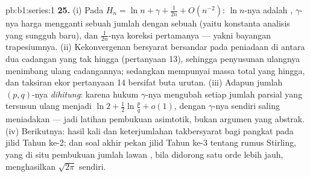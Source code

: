 \begin{solution}{pb:b1:series:1}
\textbf{25.} (i) Pada $H_n = \ln n + \gamma + \frac{1}{2n} +
O(n^{-2})$: $\ln n$-nya adalah , $\gamma$-nya harga
mengganti sebuah jumlah dengan sebuah  (yaitu konstanta analisis yang
sungguh baru), dan $\frac{1}{2n}$-nya koreksi pertamanya --- yakni
bayangan trapesiumnya. (ii) Kekonvergenan bersyarat bersandar pada
peniadaan di antara dua cadangan yang tak hingga (pertanyaan 13), sehingga
penyusunan ulangnya menimbang ulang cadangannya; sedangkan  mempunyai
massa total yang hingga, dan taksiran ekor pertanyaan 14 bersifat
buta urutan. (iii) Adapun jumlah $(p,q)$-nya \emph{dihitung}: karena
hukum $\gamma$-nya mengubah setiap jumlah parsial yang tersusun ulang menjadi $\ln 2 +
\frac12\ln\frac pq + o(1)$, dengan $\gamma$-nya sendiri saling meniadakan ---
jadi latihan pembukuan asimtotik, bukan argumen yang abstrak.
(iv) Berikutnya: hasil kali dan keterjumlahan takbersyarat bagi 
pangkat pada jilid Tahun ke-2; dan soal akhir pekan jilid Tahun ke-3
tentang rumus Stirling, yang di situ pembukuan jumlah lawan ,
bila didorong satu orde lebih jauh, menghasilkan $\sqrt{2\pi}$
sendiri.

\end{solution}
